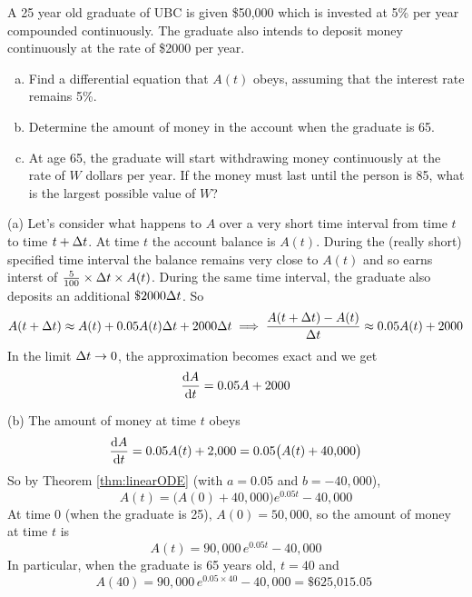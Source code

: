 \begin{eg}\label{eg:SDEmoneyC}
A 25 year old graduate of UBC is given \$50,000 which is invested
at 5\% per year compounded continuously. The graduate also intends to
deposit money continuously at the rate of \$2000 per year.
\begin{enumerate}[(a)]
\item  Find a differential equation that $A(t)$ obeys, assuming that
the interest rate remains 5\%.

\item  Determine the amount of money in the account when the graduate
is 65.

\item  At age 65, the graduate will start withdrawing money
continuously at the rate of $W$ dollars per year. If the money
must last until the person is 85, what is the largest possible
value of $W$?
\end{enumerate}

\soln (a) Let's consider what happens to $A$ over a very short time
interval from time $t$ to time $t + \Delta t$. At time $t$ the account balance
is $A(t)$. During the (really short) specified time interval the balance
remains very close to $A(t)$ and so earns interst of
$\frac{5}{100}\times\Delta t\times A(t)$.  During the same time interval,
the graduate also deposits an additional $\$ 2000\Delta t$. So
\begin{equation*}
A(t+\Delta t)\approx A(t) + 0.05 A(t)\Delta t+ 2000\Delta t
\implies
\frac{A(t+\Delta t)- A(t)}{\Delta t} \approx 0.05 A(t)  + 2000
\end{equation*}
In the limit $\Delta t\rightarrow 0$, the approximation becomes exact and
we get
\begin{equation*}
\diff{A}{t}= 0.05 A+2000
\end{equation*}

\noindent (b) The amount of money at time $t$ obeys
\begin{equation*}
\diff{A}{t}= 0.05 A(t)+2,\!000=0.05\big(A(t)+40,\!000\big)
\end{equation*}
So by Theorem \ref{thm:linearODE}
(with $a=0.05$ and $b=-40,\!000$),
\begin{equation*}
A(t)=\big(A(0)+40,\!000\big)e^{0.05 t} -40,\!000
\end{equation*}
At time 0 (when the graduate is 25), $A(0)=50,\!000$, so the amount of
money at time $t$ is
\begin{equation*}
A(t)=90,\!000\, e^{0.05 t}-40,000
\end{equation*}
In particular, when the graduate is 65 years old, $t=40$ and
\begin{equation*}
A(40)=90,\!000\, e^{0.05 \times 40}-40,000=\text{\$625,015.05 }
\end{equation*}


\end{eg}
